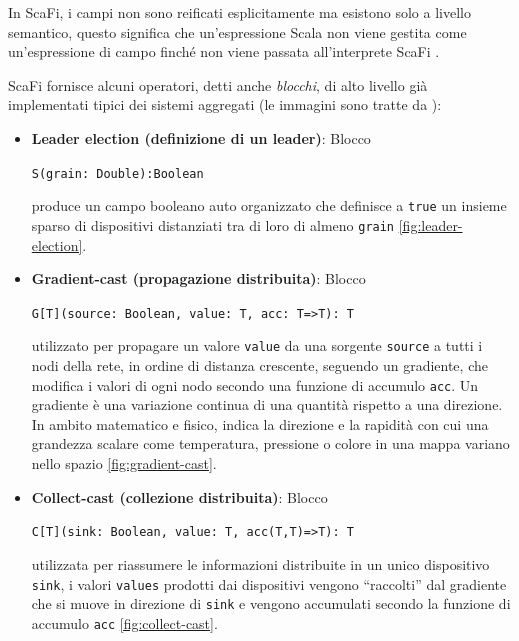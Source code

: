 \documentclass[12pt,a4paper,openright,twoside]{book}
\begin{document}
In ScaFi, i campi non sono reificati esplicitamente ma esistono solo a livello semantico, questo significa che un'espressione Scala non viene gestita come un'espressione di campo finché non viene passata all'interprete ScaFi \cite{CasadeiPhDThesis}.

ScaFi fornisce alcuni operatori, detti anche \textit{blocchi}, di alto livello già implementati tipici dei sistemi aggregati \cite{Casadei2022} (le immagini sono tratte da \cite{CasadeiPhDThesis}):

\begin{itemize}
    \item \textbf{Leader election (definizione di un leader)}: Blocco 
    \begin{center}
        \verb|S(grain: Double):Boolean|
    \end{center}
    produce un campo booleano auto organizzato che definisce a \verb|true| un insieme sparso di dispositivi distanziati tra di loro di almeno \verb|grain| \cref{fig:leader-election}.
    \item \textbf{Gradient-cast (propagazione distribuita)}: Blocco 
    \begin{center}
        \verb|G[T](source: Boolean, value: T, acc: T=>T): T|
    \end{center}
    utilizzato per propagare un valore \verb|value| da una sorgente \verb|source| a tutti i nodi della rete, in ordine di distanza crescente, seguendo un gradiente, che modifica i valori di ogni nodo secondo una funzione di accumulo \verb|acc|. Un gradiente è una variazione continua di una quantità rispetto a una direzione. In ambito matematico e fisico, indica la direzione e la rapidità con cui una grandezza scalare come temperatura, pressione o colore in una mappa variano nello spazio \cref{fig:gradient-cast}.
    \item \textbf{Collect-cast (collezione distribuita)}: Blocco 
    \begin{center}
        \verb|C[T](sink: Boolean, value: T, acc(T,T)=>T): T| 
    \end{center}
    utilizzata per riassumere le informazioni distribuite in un unico dispositivo \verb|sink|, i valori \verb|values| prodotti dai dispositivi vengono ``raccolti'' dal gradiente che si muove in direzione di \verb|sink| e vengono accumulati secondo la funzione di accumulo \verb|acc| \cref{fig:collect-cast}.
\end{itemize}
\end{document}
